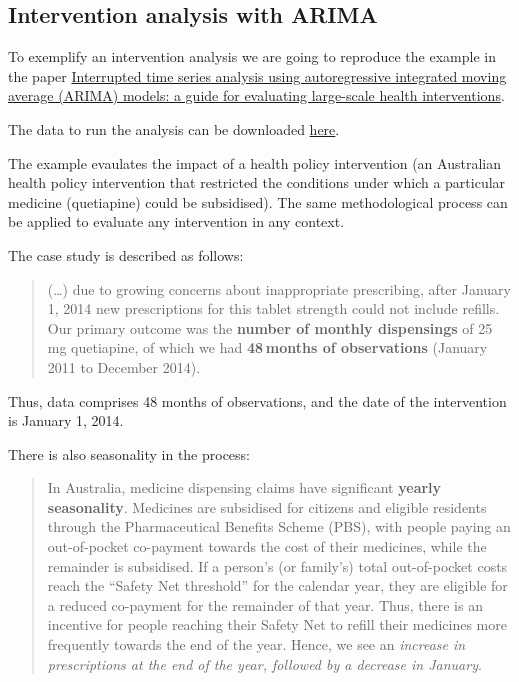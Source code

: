 \documentclass[
]{article}
\begin{document}
\hypertarget{intervention-analysis-with-arima}{%
\subsection{Intervention analysis with ARIMA}\label{intervention-analysis-with-arima}}

To exemplify an intervention analysis we are going to reproduce the example in the paper \href{https://bmcmedresmethodol.biomedcentral.com/articles/10.1186/s12874-021-01235-8\#Sec13}{Interrupted time series analysis using autoregressive integrated moving average (ARIMA) models: a guide for evaluating large-scale health interventions}.

The data to run the analysis can be downloaded \href{https://static-content.springer.com/esm/art\%3A10.1186\%2Fs12874-021-01235-8/MediaObjects/12874_2021_1235_MOESM1_ESM.csv}{here}.

The example evaulates the impact of a health policy intervention (an Australian health policy intervention that restricted the conditions under which a particular medicine (quetiapine) could be subsidised). The same methodological process can be applied to evaluate any intervention in any context.

The case study is described as follows:

\begin{quote}
(\ldots) due to growing concerns about inappropriate prescribing, after January 1, 2014 new prescriptions for this tablet strength could not include refills. Our primary outcome was the \textbf{number of monthly dispensings} of 25 mg quetiapine, of which we had \textbf{48 months of observations} (January 2011 to December 2014).
\end{quote}

Thus, data comprises 48 months of observations, and the date of the intervention is January 1, 2014.

There is also seasonality in the process:

\begin{quote}
In Australia, medicine dispensing claims have significant \textbf{yearly seasonality}. Medicines are subsidised for citizens and eligible residents through the Pharmaceutical Benefits Scheme (PBS), with people paying an out-of-pocket co-payment towards the cost of their medicines, while the remainder is subsidised. If a person's (or family's) total out-of-pocket costs reach the ``Safety Net threshold'' for the calendar year, they are eligible for a reduced co-payment for the remainder of that year. Thus, there is an incentive for people reaching their Safety Net to refill their medicines more frequently towards the end of the year. Hence, we see an \emph{increase in prescriptions at the end of the year, followed by a decrease in January}.
\end{quote}
\end{document}

